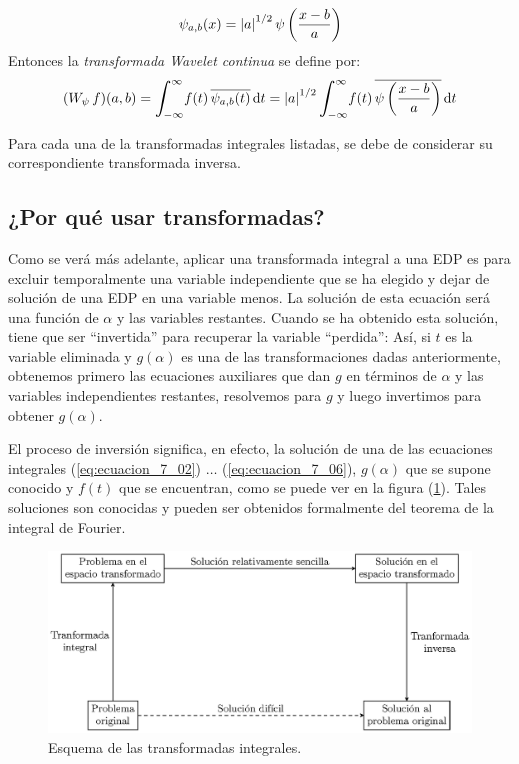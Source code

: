\begin{enumerate}
\begin{align*}
\psi_{a, b} (x) = \abs{a}^{1/2} \, \psi \left( \dfrac{x - b}{a} \right)
\end{align*}
Entonces la \emph{transformada Wavelet continua} se define por:
\begin{align*}
(W_{\psi} \, f) (a, b) = \scaleint{6ex}_{\bs -\infty}^{\infty} f(t) \, \overline{\psi_{a, b} (t)} \dd{t} = \abs{a}^{1/2} \, \scaleint{6ex}_{\bs -\infty}^{\infty} f(t) \, \overline{\psi \left( \dfrac{x - b}{a} \right)} \dd{t}
\end{align*}
\end{enumerate}
Para cada una de la transformadas integrales listadas, se debe de considerar su correspondiente transformada inversa.

\subsection{¿Por qué usar transformadas?}

Como se verá más adelante, aplicar una transformada integral a una EDP es para excluir temporalmente una variable independiente que se ha elegido y dejar de solución de una EDP en una variable menos. La solución de esta ecuación será una función de $\alpha$ y las variables restantes. Cuando se ha obtenido esta solución, tiene que ser \enquote{invertida} para recuperar la variable \enquote{perdida}: Así, si $t$ es la variable eliminada y $g (\alpha)$ es una de las transformaciones dadas anteriormente, obtenemos primero las ecuaciones auxiliares que dan $g$ en términos de $\alpha$ y las variables independientes restantes, resolvemos para $g$ y luego invertimos para obtener $g(\alpha)$.
\par
El proceso de inversión significa, en efecto, la solución de una de las ecuaciones integrales (\ref{eq:ecuacion_7_02}) $\ldots$ (\ref{eq:ecuacion_7_06}), $g (\alpha)$ que se supone conocido y $f(t)$ que se encuentran, como se puede ver en la figura (\ref{fig:figura_01}). Tales soluciones son conocidas y pueden ser obtenidos formalmente del teorema de la integral de Fourier.
\begin{figure}[H]
    \centering
    \includegraphics[scale=1]{Imagenes/esquema_transformadas.eps}
    \caption{Esquema de las transformadas integrales.}
    \label{fig:figura_01}
\end{figure}
